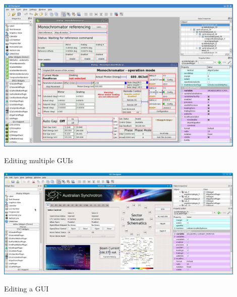  
\begin{DoxyImage}
\includegraphics[width=12cm]{designerExample1}
\caption{Editing multiple GUIs}
\end{DoxyImage}
 \par
\par


 
\begin{DoxyImage}
\includegraphics[width=12cm]{designerExample2}
\caption{Editing a GUI}
\end{DoxyImage}
 